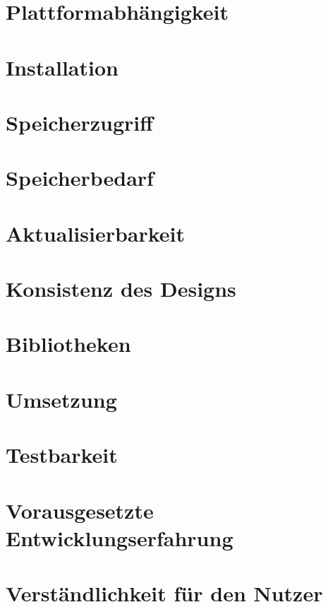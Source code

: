 \section{Plattformabhängigkeit} \label{sec:6-plattform}


\section{Installation} \label{sec:6-installation}


\section{Speicherzugriff} \label{sec:6-speicherzugriff}


\section{Speicherbedarf} \label{sec:6-speicherbedarf}


\section{Aktualisierbarkeit} \label{sec:6-aktualisierbarkeit}


\section{Konsistenz des Designs} \label{sec:6-konsistenz-des-designs}


\section{Bibliotheken} \label{sec:6-bibliotheken}


\section{Umsetzung} \label{sec:6-umsetzung}


\section{Testbarkeit} \label{sec:6-testbarkeit}


\section{Vorausgesetzte Entwicklungserfahrung} \label{sec:6-vorausgesetzte-entwicklungserfahrung}


\section{Verständlichkeit für den Nutzer} \label{sec:6-verstaendlichkeit}
